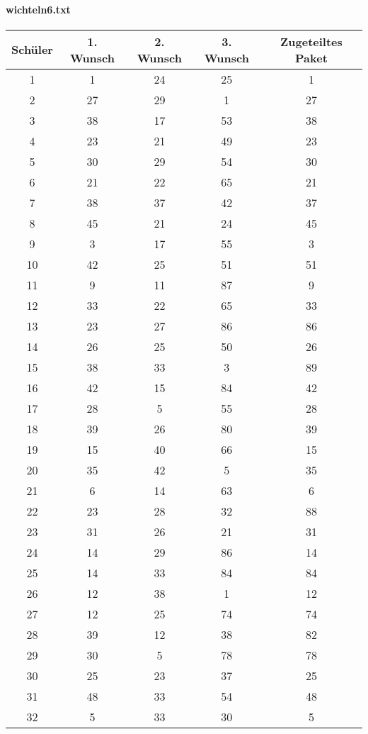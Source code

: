 \documentclass[a4paper,10pt,ngerman]{scrartcl}
\begin{document}
\paragraph{wichteln6.txt}
\begin{longtable}[c]{c|c|c|c|c}
    Schüler & 1. Wunsch & 2. Wunsch & 3. Wunsch & Zugeteiltes Paket \\
    \hline
    \endhead
    1 & 1 & 24 & 25 & 1 \\
    2 & 27 & 29 & 1 & 27 \\
    3 & 38 & 17 & 53 & 38 \\
    4 & 23 & 21 & 49 & 23 \\
    5 & 30 & 29 & 54 & 30 \\
    6 & 21 & 22 & 65 & 21 \\
    7 & 38 & 37 & 42 & 37 \\
    8 & 45 & 21 & 24 & 45 \\
    9 & 3 & 17 & 55 & 3 \\
    10 & 42 & 25 & 51 & 51 \\
    11 & 9 & 11 & 87 & 9 \\
    12 & 33 & 22 & 65 & 33 \\
    13 & 23 & 27 & 86 & 86 \\
    14 & 26 & 25 & 50 & 26 \\
    15 & 38 & 33 & 3 & 89 \\
    16 & 42 & 15 & 84 & 42 \\
    17 & 28 & 5 & 55 & 28 \\
    18 & 39 & 26 & 80 & 39 \\
    19 & 15 & 40 & 66 & 15 \\
    20 & 35 & 42 & 5 & 35 \\
    21 & 6 & 14 & 63 & 6 \\
    22 & 23 & 28 & 32 & 88 \\
    23 & 31 & 26 & 21 & 31 \\
    24 & 14 & 29 & 86 & 14 \\
    25 & 14 & 33 & 84 & 84 \\
    26 & 12 & 38 & 1 & 12 \\
    27 & 12 & 25 & 74 & 74 \\
    28 & 39 & 12 & 38 & 82 \\
    29 & 30 & 5 & 78 & 78 \\
    30 & 25 & 23 & 37 & 25 \\
    31 & 48 & 33 & 54 & 48 \\
    32 & 5 & 33 & 30 & 5 \\

\end{longtable}
\end{document}
